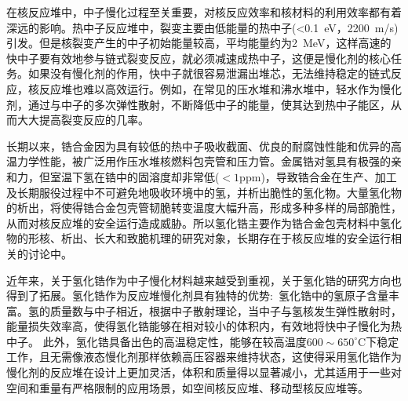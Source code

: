 \maketitle
在核反应堆中，中子慢化过程至关重要，对核反应效率和核材料的利用效率都有着深远的影响。热中子反应堆中，裂变主要由低能量的热中子\textrm{(<0.1~eV，2200~m/s)}引发。但是核裂变产生的中子初始能量较高，平均能量约为\textrm{2~MeV}，这样高速的快中子要有效地参与链式裂变反应，就必须减速成热中子，这便是慢化剂的核心任务。如果没有慢化剂的作用，快中子就很容易泄漏出堆芯，无法维持稳定的链式反应，核反应堆也难以高效运行。例如，在常见的压水堆和沸水堆中，轻水作为慢化剂，通过与中子的多次弹性散射，不断降低中子的能量，使其达到热中子能区，从而大大提高裂变反应的几率。

长期以来，锆合金因为具有较低的热中子吸收截面、优良的耐腐蚀性能和优异的高温力学性能，被广泛用作压水堆核燃料包壳管和压力管。金属锆对氢具有极强的亲和力，但室温下氢在锆中的固溶度却非常低\textrm{($<1\mathrm{ppm}$)}，导致锆合金在生产、加工及长期服役过程中不可避免地吸收环境中的氢，并析出脆性的氢化物。大量氢化物的析出，将使得锆合金包壳管韧脆转变温度大幅升高，形成多种多样的局部脆性，从而对核反应堆的安全运行造成威胁。所以氢化锆主要作为锆合金包壳材料中氢化物的形核、析出、长大和致脆机理的研究对象，长期存在于核反应堆的安全运行相关的讨论中。

近年来，关于氢化锆作为中子慢化材料越来越受到重视，关于氢化锆的研究方向也得到了拓展。氢化锆作为反应堆慢化剂具有独特的优势:~氢化锆中的氢原子含量丰富。氢的质量数与中子相近，根据中子散射理论，当中子与氢核发生弹性散射时，能量损失效率高，使得氢化锆能够在相对较小的体积内，有效地将快中子慢化为热中子。%
此外，氢化锆具备出色的高温稳定性，能够在较高温度$600\sim650^{\circ}\mathrm{C}$下稳定工作，且无需像液态慢化剂那样依赖高压容器来维持状态，这使得采用氢化锆作为慢化剂的反应堆在设计上更加灵活，体积和质量得以显著减小，尤其适用于一些对空间和重量有严格限制的应用场景，如空间核反应堆、移动型核反应堆等。

